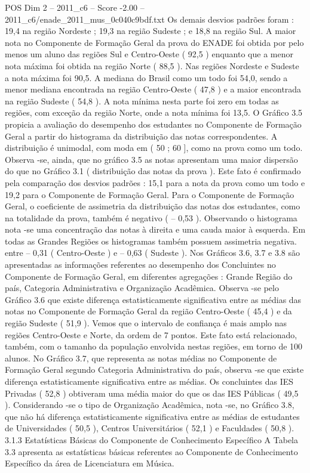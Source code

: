 \begin{textsample}{POS Dim 2 – 2011\_c6 – Score -2.00 – 2011\_c6/enade\_2011\_mus\_0c040c9bdf.txt}
Os demais desvios padrões foram : 19,4 na região Nordeste ; 19,3 na região Sudeste ; e 18,8 na região Sul.
A maior nota no Componente de Formação Geral da prova do ENADE foi obtida por pelo menos um aluno das regiões Sul e Centro-Oeste ( 92,5 ) enquanto que a menor nota máxima foi obtida na região Norte ( 88,5 ).
Nas regiões Nordeste e Sudeste a nota máxima foi 90,5.
A mediana do Brasil como um todo foi 54,0, sendo a menor mediana encontrada na região Centro-Oeste ( 47,8 ) e a maior encontrada na região Sudeste ( 54,8 ).
A nota mínima nesta parte foi zero em todas as regiões, com exceção da região Norte, onde a nota mínima foi 13,5.
O Gráfico 3.5 propicia a avaliação do desempenho dos estudantes no Componente de Formação Geral a partir do histograma da distribuição das notas correspondentes.
A distribuição é unimodal, com moda em ( 50 ; 60 ], como na prova como um todo.
Observa -se, ainda, que no gráfico 3.5 as notas apresentam uma maior dispersão do que no Gráfico 3.1 ( distribuição das notas da prova ).
Este fato é confirmado pela comparação dos desvios padrões : 15,1 para a nota da prova como um todo e 19,2 para o Componente de Formação Geral.
Para o Componente de Formação Geral, o coeficiente de assimetria da distribuição das notas dos estudantes, como na totalidade da prova, também é negativo ( – 0,53 ).
Observando o histograma nota -se uma concentração das notas à direita e uma cauda maior à esquerda.
Em todas as Grandes Regiões os histogramas também possuem assimetria negativa. entre – 0,31 ( Centro-Oeste ) e – 0,63 ( Sudeste ).
Nos Gráficos 3.6, 3.7 e 3.8 são apresentadas as informações referentes ao desempenho dos Concluintes no Componente de Formação Geral, em diferentes agregações : Grande Região do país, Categoria Administrativa e Organização Acadêmica.
Observa -se pelo Gráfico 3.6 que existe diferença estatisticamente significativa entre as médias das notas no Componente de Formação Geral da região Centro-Oeste ( 45,4 ) e da região Sudeste ( 51,9 ).
Vemos que o intervalo de confiança é mais amplo nas regiões Centro-Oeste e Norte, da ordem de 7 pontos.
Este fato está relacionado, também, com o tamanho da população envolvida nestas regiões, em torno de 100 alunos.
No Gráfico 3.7, que representa as notas médias no Componente de Formação Geral segundo Categoria Administrativa do país, observa -se que existe diferença estatisticamente significativa entre as médias.
Os concluintes das IES Privadas ( 52,8 ) obtiveram uma média maior do que os das IES Públicas ( 49,5 ).
Considerando -se o tipo de Organização Acadêmica, nota -se, no Gráfico 3.8, que não há diferença estatisticamente significativa entre as médias de estudantes de Universidades ( 50,5 ), Centros Universitários ( 52,1 ) e Faculdades ( 50,8 ). 3.1.3 Estatísticas Básicas do Componente de Conhecimento Específico A Tabela 3.3 apresenta as estatísticas básicas referentes ao Componente de Conhecimento Específico da área de Licenciatura em Música.

\end{textsample}
